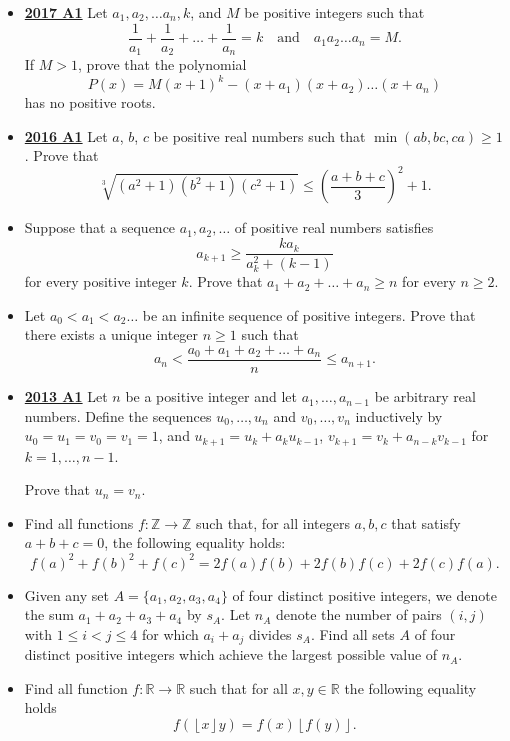 \documentclass[11pt]{scrartcl}
\begin{document}
\begin{itemize}[leftmargin=*]
\item \href{https://artofproblemsolving.com/community/c6h1671272p10632289}{\textbf{2017 A1}} Let $a_1,a_2,\dots a_n,k$, and $M$ be positive integers such that
$$\frac{1}{a_1}+\frac{1}{a_2}+\dots+\frac{1}{a_n}=k\quad\text{and}\quad a_1a_2\dots a_n=M.$$If $M>1$, prove that the polynomial
$$P(x)=M(x+1)^k-(x+a_1)(x+a_2)\dots (x+a_n)$$has no positive roots.
\item \href{https://artofproblemsolving.com/community/c6h1480690p8639254}{\textbf{2016 A1}} 	Let $a$, $b$, $c$ be positive real numbers such that $\min(ab,bc,ca) \geqslant 1$. Prove that$$\sqrt[3]{(a^2+1)(b^2+1)(c^2+1)} \leqslant \left(\frac{a+b+c}{3}\right)^2 + 1.$$
\item {} Suppose that a sequence $a_1,a_2,\dots$ of positive real numbers satisfies\[a_{k+1}\geqslant  \frac{ka_k}{a_k^2+(k-1)}\]for every positive integer $k$. Prove that $a_1+a_2+\dots+a_n\geqslant  n$ for every $n\geqslant  2$.
\item {} Let $a_0 < a_1 < a_2 \dots$ be an infinite sequence of positive integers. Prove that there exists a unique integer $n\geqslant  1$ such that \[a_n < \frac{a_0+a_1+a_2+\dots+a_n}{n} \leqslant a_{n+1}.\]
\item \href{https://artofproblemsolving.com/community/c6h597118p3543340}{\textbf{2013 A1}} Let $n$ be a positive integer and let $a_1, \dots, a_{n-1} $ be arbitrary real numbers. Define the sequences $u_0, \dots, u_n $ and $v_0, \dots, v_n $ inductively by $u_0 = u_1  = v_0 = v_1 = 1$, and $u_{k+1} = u_k + a_k u_{k-1}$, $v_{k+1} = v_k + a_{n-k} v_{k-1}$ for $k=1, \dots, n-1.$

Prove that $u_n = v_n.$
\item {} Find all functions $f:\mathbb Z\rightarrow \mathbb Z$ such that, for all integers $a,b,c$ that satisfy $a+b+c=0$, the following equality holds:
\[f(a)^2+f(b)^2+f(c)^2=2f(a)f(b)+2f(b)f(c)+2f(c)f(a).\]
\item {} 	Given any set $A = \{a_1, a_2, a_3, a_4\}$ of four distinct positive integers, we denote the sum $a_1 +a_2 +a_3 +a_4$ by $s_A$. Let $n_A$ denote the number of pairs $(i, j)$ with $1 \leqslant  i < j \leqslant 4$ for which $a_i +a_j$ divides $s_A$. Find all sets $A$ of four distinct positive integers which achieve the largest possible value of $n_A$.
\item {} Find all function $f:\mathbb{R}\rightarrow\mathbb{R}$ such that for all $x,y\in\mathbb{R}$ the following equality holds\[
f(\left\lfloor x\right\rfloor y)=f(x)\left\lfloor f(y)\right\rfloor. \]


\end{itemize}
\end{document}
